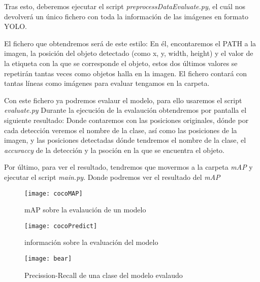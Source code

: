 
Tras esto, deberemos ejecutar el script \textit{preprocessDataEvaluate.py}, el cuál nos devolverá un único fichero con toda la información de las imágenes en formato YOLO.

El fichero que obtendremos será de este estilo:
En él, encontaremos el PATH a la imagen, la posición del objeto detectado (como x, y, width, height) y el valor de la etiqueta con la que se corresponde el objeto, estos dos últimos valores se repetirán tantas veces como objetos halla en la imagen. El fichero contará con tantas líneas como imágenes para evaluar tengamos en la carpeta.

Con este fichero ya podremos evalaur el modelo, para ello usaremos el script \textit{evaluate.py}
Durante la ejecución de la evalaución obtendremos por pantalla el siguiente resultado:
Donde contaremos con las posiciones originales, dónde por cada detección veremos el nombre de la clase, así como las posiciones de la imagen, y las posiciones detectadas dónde tendremos el nombre de la clase, el \textit{accuraccy} de la detección y la psoción en la que se encuentra el objeto.

Por último, para ver el resultado, tendremos que movermos a la carpeta \textit{mAP} y ejecutar el script \textit{main.py}.
Donde podremos ver el resultado del \textit{mAP}

\begin{figure}[!h]
    \centering
    \texttt{[image: cocoMAP]}
    \caption{mAP sobre la evalaución de un modelo}\label{fig:cocoMAP}
\end{figure}

\begin{figure}[!h]
    \centering
    \texttt{[image: cocoPredict]}
    \caption{información sobre la evaluación del modelo}\label{fig:cocoPredict}
\end{figure}

\begin{figure}[!h]
    \centering
    \texttt{[image: bear]}
    \caption{Precission-Recall de una clase del modelo evalaudo}\label{fig:bear}
\end{figure}